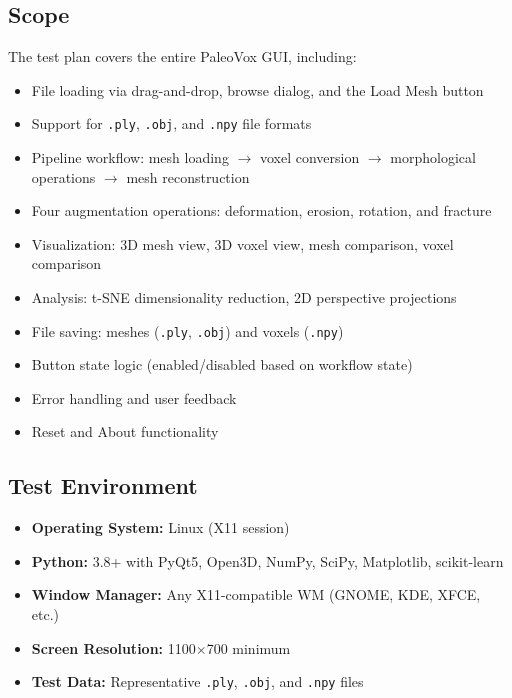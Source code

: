 \documentclass[12pt,a4paper]{article}
\begin{document}
\subsection{Scope}
The test plan covers the entire PaleoVox GUI, including:
\begin{itemize}
  \item File loading via drag-and-drop, browse dialog, and the Load Mesh button
  \item Support for \texttt{.ply}, \texttt{.obj}, and \texttt{.npy} file formats
  \item Pipeline workflow: mesh loading $\rightarrow$ voxel conversion $\rightarrow$ morphological operations $\rightarrow$ mesh reconstruction
  \item Four augmentation operations: deformation, erosion, rotation, and fracture
  \item Visualization: 3D mesh view, 3D voxel view, mesh comparison, voxel comparison
  \item Analysis: t-SNE dimensionality reduction, 2D perspective projections
  \item File saving: meshes (\texttt{.ply}, \texttt{.obj}) and voxels (\texttt{.npy})
  \item Button state logic (enabled/disabled based on workflow state)
  \item Error handling and user feedback
  \item Reset and About functionality
\end{itemize}

\subsection{Test Environment}
\begin{itemize}
  \item \textbf{Operating System:} Linux (X11 session)
  \item \textbf{Python:} 3.8+ with PyQt5, Open3D, NumPy, SciPy, Matplotlib, scikit-learn
  \item \textbf{Window Manager:} Any X11-compatible WM (GNOME, KDE, XFCE, etc.)
  \item \textbf{Screen Resolution:} 1100$\times$700 minimum
  \item \textbf{Test Data:} Representative \texttt{.ply}, \texttt{.obj}, and \texttt{.npy} files
\end{itemize}

\newpage

\end{document}

